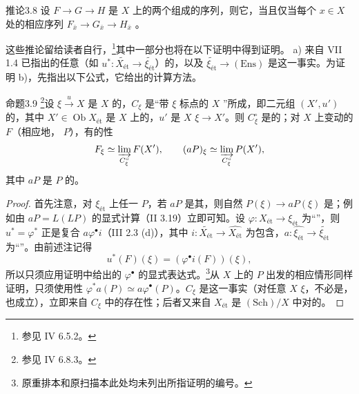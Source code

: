 \begin{SGAresult}{推论}{3.8}
设 $F\to G\to H$ 是 $X$ 上的两个组成的序列，则它，当且仅当每个 $x\in X$ 处的相应序列 $F_{\bar x}\to G_{\bar x}\to H_{\bar x}$ 。
\end{SGAresult}
这些推论留给读者自行，\footnote{参见 IV 6.5.2。}其中一部分也将在以下证明中得到证明。
a) 来自 VII 1.4 已指出的任意（如 $u^*:\widetilde{X_{\text{ét}}}\to\widetilde{\xi_{\text{ét}}}$）的，以及 $\widetilde{\xi_{\text{ét}}}\to(\mathrm{Ens})$ 是这一事实。为证明 b)，先指出以下公式，它给出的计算方法。
\begin{SGAresult}{命题}{3.9}
\footnote{参见 IV 6.8.3。}设 $\xi\xrightarrow{u}X$ 是 $X$ 的，$C_\xi$ 是“带 $\xi$ 标点的 $X$ ”所成，即二元组 $(X',u')$ 的，其中 $X'\in\operatorname{Ob}X_{\text{ét}}$ 是 $X$ 上的，$u'$ 是 $X$  $\xi\to X'$。则 $C_\xi^\circ$ 是的；对 $X$ 上变动的 $F$（相应地， $P$），有的性
\[F_\xi\simeq\varinjlim_{C_\xi^\circ}F(X'),\qquad
(aP)_\xi\simeq\varinjlim_{C_\xi^\circ}P(X'),\]
其中 $aP$ 是 $P$ 的。
\end{SGAresult}
\begin{proof}
首先注意，对 $\xi_{\text{ét}}$ 上任一 $P$，若 $aP$ 是其，则自然 $P(\xi)\to aP(\xi)$ 是；例如由 $aP=L(LP)$ 的显式计算（II 3.19）立即可知。设 $\varphi:X_{\text{ét}}\to\xi_{\text{ét}}$ 为“”，则 $u^*=\varphi^*$ 正是复合 $a\varphi^\bullet i$（III 2.3 (d)），其中 $i:\widetilde{X_{\text{ét}}}\to\widehat{X_{\text{ét}}}$ 为包含，$a:\widehat{\xi_{\text{ét}}}\to\widetilde{\xi_{\text{ét}}}$ 为“”。由前述注记得
\[u^*(F)(\xi)=(\varphi^\bullet i(F))(\xi),\]
所以只须应用证明中给出的 $\varphi^\bullet$ 的显式表达式。\footnote{原重排本和原扫描本此处均未列出所指证明的编号。}从 $X$ 上的 $P$ 出发的相应情形同样证明，只须使用性 $\varphi^*a(P)\simeq a\varphi^\bullet(P)$。$C_\xi$ 是这一事实（对任意 $X$  $\xi$，不必是，也成立），立即来自 $C_\xi$ 中的存在性；后者又来自 $X_{\text{ét}}$ 是 $(\mathrm{Sch})/X$ 中对的。
\end{proof}
